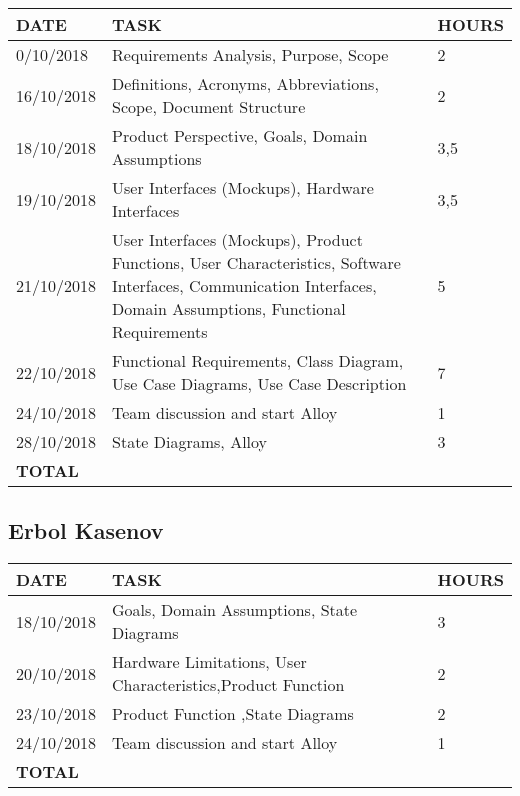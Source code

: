 \documentclass[12pt]{article}
\begin{document}
\begin{center}
\begin{tabular}{ |p{}|p{}|p{}| } 
 \hline
 \textbf{DATE} & \textbf{TASK} & \textbf{HOURS} \\ 
  \hline
  0/10/2018 & Requirements Analysis, Purpose, Scope & 2 \\ 
  \hline
  16/10/2018 & Definitions, Acronyms, Abbreviations, Scope, Document Structure & 2 \\ 
  \hline
  18/10/2018 & Product Perspective, Goals, Domain Assumptions & 3,5 \\ 
  \hline
  19/10/2018 & User Interfaces (Mockups), Hardware Interfaces & 3,5 \\ 
  \hline
  21/10/2018 & User Interfaces (Mockups), Product Functions, User Characteristics, Software Interfaces, Communication Interfaces, Domain Assumptions, Functional Requirements & 5 \\ 
  \hline
  22/10/2018 & Functional Requirements, Class Diagram, Use Case Diagrams, Use Case Description & 7 \\ 
  \hline
  24/10/2018 & Team discussion and start Alloy & 1 \\ 
  \hline
  28/10/2018 & State Diagrams, Alloy & 3 \\ 
  \hline
  \textbf{TOTAL} & \multicolumn{2}{c|}{} \\ 
  \hline
\end{tabular}
\end{center}


\subsection{Erbol Kasenov}

\begin{center}
\begin{tabular}{ |p{}|p{}|p{}| } 
 \hline
 \textbf{DATE} & \textbf{TASK} & \textbf{HOURS} \\ 
  \hline
  18/10/2018 & Goals, Domain Assumptions, State Diagrams & 3\\ 
  \hline
  20/10/2018 & Hardware Limitations, User Characteristics,Product Function & 2 \\ 
  \hline
  23/10/2018 & Product Function ,State Diagrams & 2 \\ 
  \hline
  24/10/2018 & Team discussion and start Alloy & 1 \\ 
  \hline
  \textbf{TOTAL} & \multicolumn{2}{c|}{} \\ 
  \hline
\end{tabular}
\end{center}
\end{document}
